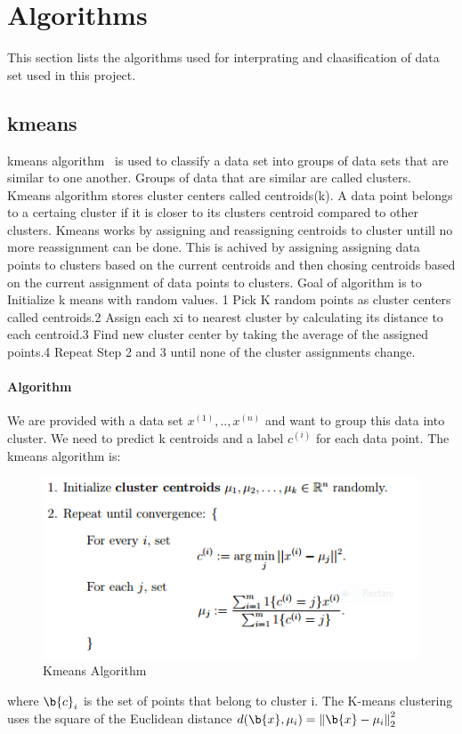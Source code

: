 \section{Algorithms}
This section lists the algorithms used for interprating and
claasification of data set used in this project.

\subsection{kmeans}

kmeans algorithm~\cite{hid-sp18-413-kmeans} is used to classify a data
set into groups of data sets that are similar to one another. Groups
of data that are similar are called clusters. Kmeans algorithm stores
cluster centers called centroids(k). A data point belongs to a
certaing cluster if it is closer to its clusters centroid compared to
other clusters.  Kmeans works by assigning and reassigning centroids
to cluster untill no more reassignment can be done. This is achived by
assigning assigning data points to clusters based on the current
centroids and then chosing centroids based on the current assignment
of data points to clusters. Goal of algorithm is to Initialize k means
with random values. 1 Pick K random points as cluster centers called
centroids.2 Assign each xi to nearest cluster by calculating its
distance to each centroid.3 Find new cluster center by taking the
average of the assigned points.4 Repeat Step 2 and 3 until none of the
cluster assignments change.
\paragraph{Algorithm}
We are provided with a data set ${x^{(1)}, .. , x^{(n)}}$ and want
to group this data into cluster. We need to predict k centroids and a
label $c^{(i)}$ for each data point. The kmeans algorithm is:

\begin{figure}[!ht]
	\centering\includegraphics[width=\columnwidth]{images/kmeans.png}
	 \caption{Kmeans Algorithm}\label{f:kmeans}
\end{figure}
where $\b{c}_i$ is the set of points that belong to cluster i. The
K-means clustering uses the square of the Euclidean distance
$d(\b{x},\mu_i) = \left\Vert \b{x}-\mu_i \right\Vert_2^2$ 

